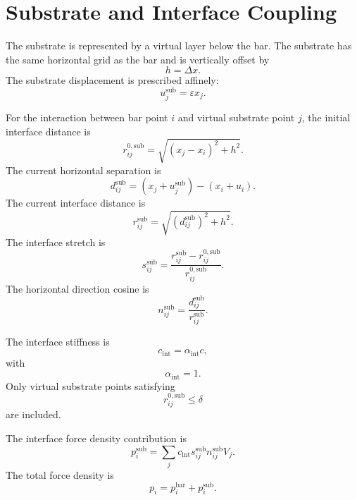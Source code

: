 \documentclass[11pt]{article}
\begin{document}
\section{Substrate and Interface Coupling}

The substrate is represented by a virtual layer below the bar. The substrate has the same horizontal grid as the bar and is vertically offset by
\begin{equation}
h = \Delta x.
\end{equation}
The substrate displacement is prescribed affinely:
\begin{equation}
u_j^{\mathrm{sub}}
=
\varepsilon x_j.
\end{equation}

For the interaction between bar point \(i\) and virtual substrate point \(j\), the initial interface distance is
\begin{equation}
r_{ij}^{0,\mathrm{sub}}
=
\sqrt{(x_j-x_i)^2+h^2}.
\end{equation}
The current horizontal separation is
\begin{equation}
d_{ij}^{\mathrm{sub}}
=
(x_j+u_j^{\mathrm{sub}})
-
(x_i+u_i).
\end{equation}
The current interface distance is
\begin{equation}
r_{ij}^{\mathrm{sub}}
=
\sqrt{
\left(d_{ij}^{\mathrm{sub}}\right)^2+h^2
}.
\end{equation}
The interface stretch is
\begin{equation}
s_{ij}^{\mathrm{sub}}
=
\frac{
r_{ij}^{\mathrm{sub}}-r_{ij}^{0,\mathrm{sub}}
}{
r_{ij}^{0,\mathrm{sub}}
}.
\end{equation}
The horizontal direction cosine is
\begin{equation}
n_{ij}^{\mathrm{sub}}
=
\frac{
d_{ij}^{\mathrm{sub}}
}{
r_{ij}^{\mathrm{sub}}
}.
\end{equation}

The interface stiffness is
\begin{equation}
c_{\mathrm{int}}
=
\alpha_{\mathrm{int}}c,
\end{equation}
with
\begin{equation}
\alpha_{\mathrm{int}} = 1.
\end{equation}
Only virtual substrate points satisfying
\begin{equation}
r_{ij}^{0,\mathrm{sub}} \le \delta
\end{equation}
are included.

The interface force density contribution is
\begin{equation}
p_i^{\mathrm{sub}}
=
\sum_j
c_{\mathrm{int}}
s_{ij}^{\mathrm{sub}}
n_{ij}^{\mathrm{sub}}
V_j.
\end{equation}
The total force density is
\begin{equation}
p_i
=
p_i^{\mathrm{bar}}
+
p_i^{\mathrm{sub}}.
\end{equation}
\end{document}
